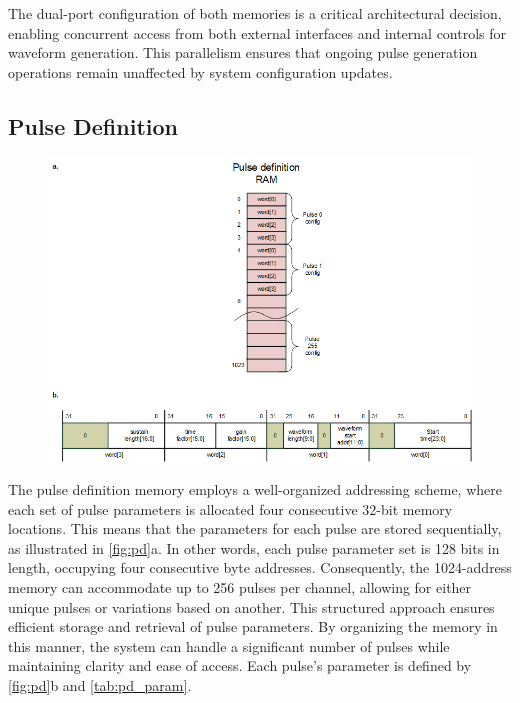 The dual-port configuration of both memories is a critical architectural decision, enabling concurrent access from both external interfaces and internal controls for waveform generation. This parallelism ensures that ongoing pulse generation operations remain unaffected by system configuration updates.

\subsection{Pulse Definition}

\begin{figure}[htbp]
    \centering
    \includegraphics[width=1\linewidth]{figures/3.2.png}
    \caption{}
    \label{fig:pd}
\end{figure}

The pulse definition memory employs a well-organized addressing scheme, where each set of pulse parameters is allocated four consecutive 32-bit memory locations. This means that the parameters for each pulse are stored sequentially, as illustrated in \autoref{fig:pd}a. In other words, each pulse parameter set is 128 bits in length, occupying four consecutive byte addresses. Consequently, the 1024-address memory can accommodate up to 256 pulses per channel, allowing for either unique pulses or variations based on another. This structured approach ensures efficient storage and retrieval of pulse parameters. By organizing the memory in this manner, the system can handle a significant number of pulses while maintaining clarity and ease of access. Each pulse's parameter is defined by \autoref{fig:pd}b and \autoref{tab:pd_param}.

